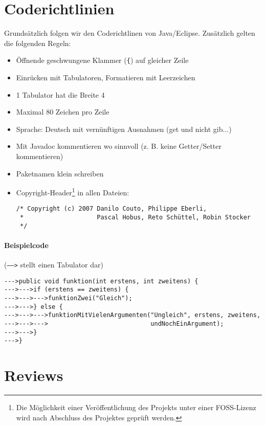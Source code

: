 \documentclass[a4paper,12pt,halfparskip,DIV14]{scrartcl}
\begin{document}


\section{Coderichtlinien}\label{sub:coderichtlinien} %

Grundsätzlich folgen wir den Coderichtlinen von Java/Eclipse. Zusätzlich gelten die folgenden Regeln:

\begin{itemize}
  \item Öffnende geschwungene Klammer (\texttt{\{}) auf gleicher Zeile
  \item Einrücken mit Tabulatoren, Formatieren mit Leerzeichen
  \item 1 Tabulator hat die Breite 4
  \item Maximal 80 Zeichen pro Zeile
  \item Sprache: Deutsch mit vernünftigen Ausnahmen (get und nicht gib...)
  \item Mit Javadoc kommentieren wo sinnvoll (z. B. keine Getter/Setter kommentieren)
  \item Paketnamen klein schreiben
  \item Copyright-Header\footnote{Die Möglichkeit einer Veröffentlichung des Projekts unter einer FOSS-Lizenz wird nach Abschluss des Projektes geprüft werden.} in allen Dateien:
    \begin{verbatim}
/* Copyright (c) 2007 Danilo Couto, Philippe Eberli,
 *                    Pascal Hobus, Reto Schüttel, Robin Stocker
 */
    \end{verbatim}
\end{itemize}


\paragraph{Beispielcode} (\texttt{----->} stellt einen Tabulator dar)

\begin{verbatim}
--->public void funktion(int erstens, int zweitens) {
--->--->if (erstens == zweitens) {
--->--->--->funktionZwei("Gleich");
--->--->} else {
--->--->--->funktionMitVielenArgumenten("Ungleich", erstens, zweitens,
--->--->--->                            undNochEinArgument);
--->--->}
--->}
\end{verbatim}

\section{Reviews} %
\label{sec:reviews}

\end{document}
